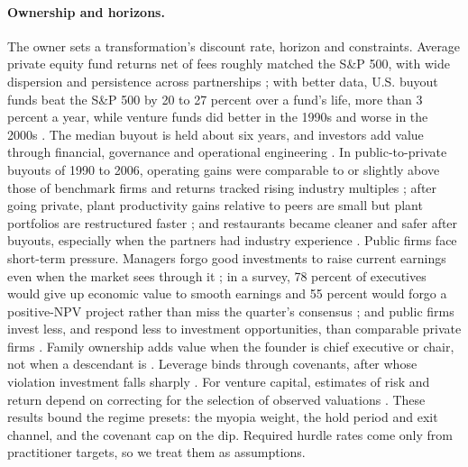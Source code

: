 \paragraph{Ownership and horizons.} The owner sets a transformation's discount rate, horizon and constraints. Average private equity fund returns net of fees roughly matched the S\&P 500, with wide dispersion and persistence across partnerships \citep{kaplan2005private}; with better data, U.S. buyout funds beat the S\&P 500 by 20 to 27 percent over a fund's life, more than 3 percent a year, while venture funds did better in the 1990s and worse in the 2000s \citep{harris2014private}. The median buyout is held about six years, and investors add value through financial, governance and operational engineering \citep{kaplan2009leveraged}. In public-to-private buyouts of 1990 to 2006, operating gains were comparable to or slightly above those of benchmark firms and returns tracked rising industry multiples \citep{guo2011do}; after going private, plant productivity gains relative to peers are small but plant portfolios are restructured faster \citep{bharath2014do}; and restaurants became cleaner and safer after buyouts, especially when the partners had industry experience \citep{bernstein2016operational}. Public firms face short-term pressure. Managers forgo good investments to raise current earnings even when the market sees through it \citep{stein1989efficient}; in a survey, 78 percent of executives would give up economic value to smooth earnings and 55 percent would forgo a positive-NPV project rather than miss the quarter's consensus \citep{graham2005economic}; and public firms invest less, and respond less to investment opportunities, than comparable private firms \citep{asker2015corporate}. Family ownership adds value when the founder is chief executive or chair, not when a descendant is \citep{villalonga2006how}. Leverage binds through covenants, after whose violation investment falls sharply \citep{chava2008how}. For venture capital, estimates of risk and return depend on correcting for the selection of observed valuations \citep{cochrane2005risk,korteweg2010risk}. These results bound the regime presets: the myopia weight, the hold period and exit channel, and the covenant cap on the dip. Required hurdle rates come only from practitioner targets, so we treat them as assumptions.

